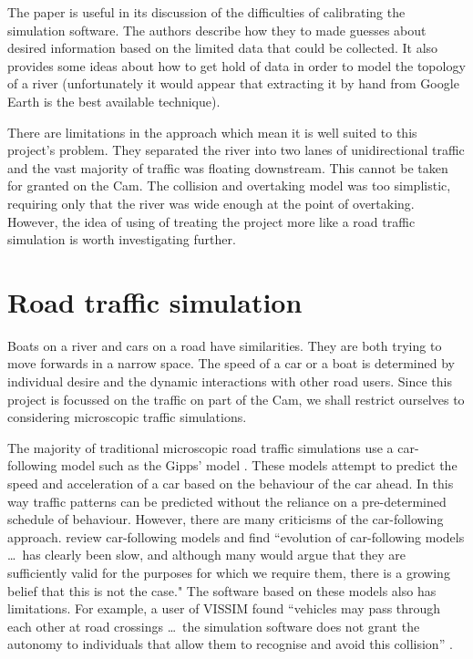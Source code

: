   The paper is useful in its discussion of the difficulties of calibrating
  the simulation software. The authors describe how they to made guesses
  about desired information based on the limited data that could be
  collected. It also provides some ideas about how to get hold of data
  in order to model the topology of a river (unfortunately it would
  appear that extracting it by hand from Google Earth is the best available
  technique). 
  
  There are limitations in the approach which mean it is well suited to this project's problem. They 
  separated the river into two lanes of unidirectional traffic and the
  vast majority of traffic was floating downstream. This cannot be taken for granted on the Cam. The collision and overtaking model was too simplistic, requiring only that the river was wide enough at the point of overtaking.
  However, the idea of using of treating the project more like a road traffic simulation is worth investigating further.
  
  \section{Road traffic simulation}
    Boats on a river and cars on a road have similarities. They are both trying to move forwards in a narrow space. The speed of a car or a boat is determined by individual desire and the dynamic interactions with other road users. Since this project is focussed on the traffic on part of the Cam, we shall restrict ourselves to considering microscopic traffic simulations.
    
    The majority of traditional microscopic road traffic simulations use a car-following model such as the Gipps' model \cite{Gipps1981}. These models attempt to predict the speed and acceleration of a car based on the behaviour of the car ahead. In this way traffic patterns can be predicted without the reliance on a pre-determined schedule of behaviour. However, there are many criticisms of the car-following approach. \textcite{Brackstone2000} review car-following models and find ``evolution of car-following models \ldots\ has clearly been slow, and although many would argue that they are sufficiently valid for the purposes for which we require them, there is a growing belief that this is not the case." The software based on these models also has limitations. For example, a user of VISSIM found ``vehicles may pass through each other at road crossings \ldots\ the simulation software does not grant the autonomy to individuals that allow them to recognise and avoid this collision'' \cite{Manley}.
    
